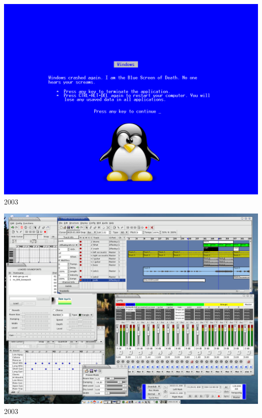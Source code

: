 \documentclass{beamer}
\begin{document}

\begin{frame}
  \begin{center}
    \includegraphics[scale=1.085]{images/hb7nfO.png}\\
    2003
  \end{center}
\end{frame}

\begin{frame}
  \begin{center}
    \includegraphics[scale=0.1667]{images/muse_desktop.png}\\
    2003
  \end{center}
\end{frame}
\end{document}
